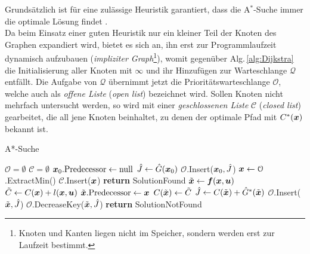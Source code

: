  Grundsätzlich ist für eine zulässige Heuristik garantiert, dass die A$^\ast$-Suche immer die optimale Lösung findet \cite{lavalle2006pa}. \\
%
Da beim Einsatz einer guten Heuristik nur ein kleiner Teil der Knoten des Graphen expandiert wird, bietet es sich an, ihn erst zur Programmlaufzeit dynamisch aufzubauen (\emph{impliziter Graph}\footnote{Knoten und Kanten liegen nicht im Speicher, sondern werden erst zur Laufzeit bestimmt.}), womit gegenüber Alg.\,\ref{alg:Dijkstra} die Initialisierung aller Knoten mit $\infty$ und ihr Hinzufügen zur Warteschlange $\mathcal Q$ entfällt. Die Aufgabe von $\mathcal Q$  übernimmt jetzt die Prioritätswarteschlange $\mathcal O$, welche auch als \emph{offene Liste} (\emph{open list}) bezeichnet wird. Sollen Knoten nicht mehrfach untersucht werden, so wird mit einer \emph{geschlossenen Liste} $\mathcal C$ (\emph{closed list}) gearbeitet, die all jene Knoten beinhaltet, zu denen der optimale Pfad mit $C^\ast(\boldsymbol{x})$ bekannt ist.

\renewcommand{\algorithmiccomment}[1]{// #1}
\begin{algorithm}[!ht]
 \caption{A*-Suche \cite{lavalle2006pa}}
 \begin{algorithmic}[1]
\STATE $\mathcal O = \emptyset$ 
\STATE $\mathcal C = \emptyset$
\STATE $\boldsymbol{x}_0.\text{Predecessor} \leftarrow \text{null}$
\STATE $\hat J \leftarrow \hat G(\boldsymbol{x}_0)$
\STATE $\mathcal O$.Insert($\boldsymbol{x}_0, \hat J $) \label{ln:A:insert1}
	\STATE $\boldsymbol{x} \leftarrow \mathcal O$.ExtractMin() \label{ln:A:ExtractMin}
	\STATE $\mathcal C$.Insert($\boldsymbol{x}$) \label{ln:A:addcl}
		\STATE \textbf{return} SolutionFound \label{ln:A:solutionfound}
	\ELSE 
			\STATE $\tilde{\boldsymbol{x}} \leftarrow \boldsymbol{f}(\boldsymbol{x},\boldsymbol{u})$ \label{ln:A:exp}
				\STATE $\tilde C \leftarrow C(\boldsymbol{x}) + l(\boldsymbol{x}, \boldsymbol{u})$
					\STATE $\tilde{\boldsymbol{x}}.\text{Predecessor}\leftarrow \boldsymbol{x}$ \label{ln:A:predesessor}
					\STATE $C(\tilde{\boldsymbol{x}}) \leftarrow \tilde C$
					\STATE $\hat J  \leftarrow C(\tilde{\boldsymbol{x}}) + \hat {G}^\ast(\tilde{\boldsymbol{x}})$
						\STATE $\mathcal O$.Insert($\tilde{\boldsymbol{x}},\hat J $) \label{ln:A:insert2}
					\ELSE
						\STATE $\mathcal O$.DecreaseKey($\tilde{\boldsymbol{x}},\hat J $) \label{ln:A:decrease}
					\ENDIF
				\ENDIF
			\ENDIF
		\ENDFOR
	\ENDIF
\ENDWHILE
\STATE \textbf{return} SolutionNotFound \label{ln:A:nosolution}
\end{algorithmic}
\label{alg:AStar}
\end{algorithm}

